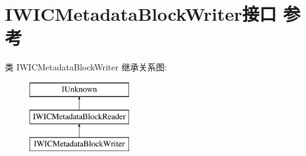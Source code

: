 \hypertarget{interface_i_w_i_c_metadata_block_writer}{}\section{I\+W\+I\+C\+Metadata\+Block\+Writer接口 参考}
\label{interface_i_w_i_c_metadata_block_writer}
类 I\+W\+I\+C\+Metadata\+Block\+Writer 继承关系图\+:\begin{figure}[H]
\begin{center}
\leavevmode
\includegraphics[height=3.000000cm]{interface_i_w_i_c_metadata_block_writer}
\end{center}
\end{figure}
